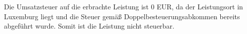 \vspace{0.5cm}
\noindent
Die Umsatzsteuer auf die erbrachte Leistung ist 0 EUR, da der Leistungsort in Luxemburg liegt und die
Steuer gemäß Doppelbesteuerungsabkommen bereits abgeführt wurde. Somit ist die Leistung nicht steuerbar.


